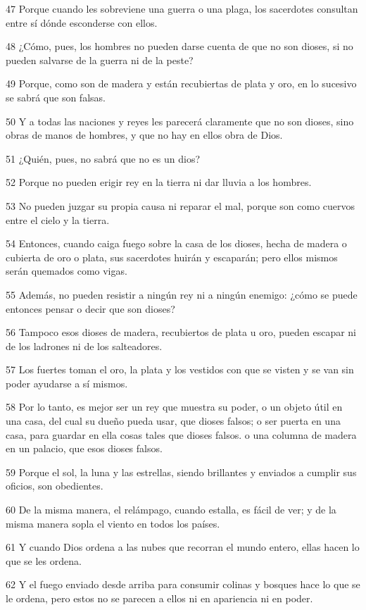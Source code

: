 \par 47 Porque cuando les sobreviene una guerra o una plaga, los sacerdotes consultan entre sí dónde esconderse con ellos.
\par 48 ¿Cómo, pues, los hombres no pueden darse cuenta de que no son dioses, si no pueden salvarse de la guerra ni de la peste?
\par 49 Porque, como son de madera y están recubiertas de plata y oro, en lo sucesivo se sabrá que son falsas.
\par 50 Y a todas las naciones y reyes les parecerá claramente que no son dioses, sino obras de manos de hombres, y que no hay en ellos obra de Dios.
\par 51 ¿Quién, pues, no sabrá que no es un dios?
\par 52 Porque no pueden erigir rey en la tierra ni dar lluvia a los hombres.
\par 53 No pueden juzgar su propia causa ni reparar el mal, porque son como cuervos entre el cielo y la tierra.
\par 54 Entonces, cuando caiga fuego sobre la casa de los dioses, hecha de madera o cubierta de oro o plata, sus sacerdotes huirán y escaparán; pero ellos mismos serán quemados como vigas.
\par 55 Además, no pueden resistir a ningún rey ni a ningún enemigo: ¿cómo se puede entonces pensar o decir que son dioses?
\par 56 Tampoco esos dioses de madera, recubiertos de plata u oro, pueden escapar ni de los ladrones ni de los salteadores.
\par 57 Los fuertes toman el oro, la plata y los vestidos con que se visten y se van sin poder ayudarse a sí mismos.
\par 58 Por lo tanto, es mejor ser un rey que muestra su poder, o un objeto útil en una casa, del cual su dueño pueda usar, que dioses falsos; o ser puerta en una casa, para guardar en ella cosas tales que dioses falsos. o una columna de madera en un palacio, que esos dioses falsos.
\par 59 Porque el sol, la luna y las estrellas, siendo brillantes y enviados a cumplir sus oficios, son obedientes.
\par 60 De la misma manera, el relámpago, cuando estalla, es fácil de ver; y de la misma manera sopla el viento en todos los países.
\par 61 Y cuando Dios ordena a las nubes que recorran el mundo entero, ellas hacen lo que se les ordena.
\par 62 Y el fuego enviado desde arriba para consumir colinas y bosques hace lo que se le ordena, pero estos no se parecen a ellos ni en apariencia ni en poder.
